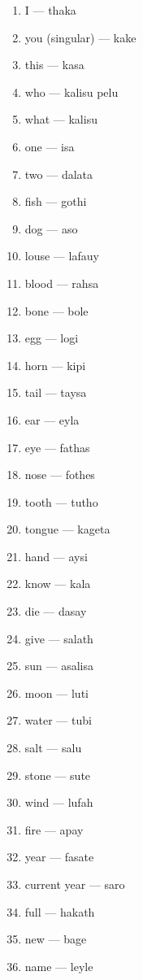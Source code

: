 \begin{multicols}{2} 
\begin{enumerate}
    \item I --- thaka
    \item you (singular) --- kake
    \item this --- kasa
    \item who --- kalisu pelu
    \item what --- kalisu
    \item one --- isa 
    \item two --- dalata
    \item fish --- gothi
    \item dog --- aso
    \item louse --- lafauy
    \item blood --- rahsa
    \item bone --- bole
    \item egg --- logi
    \item horn --- kipi
    \item tail --- taysa
    \item ear --- eyla
    \item eye --- fathas
    \item nose --- fothes
    \item tooth --- tutho
    \item tongue --- kageta
    \item hand --- aysi
    \item know --- kala
    \item die --- dasay
    \item give --- salath
    \item sun --- asalisa
    \item moon --- luti
    \item water --- tubi
    \item salt --- salu
    \item stone --- sute
    \item wind --- lufah
    \item fire --- apay
    \item year --- fasate
    \item current year --- saro
    \item full --- hakath
    \item new --- bage
    \item name --- leyle
\end{enumerate}
\end{multicols}